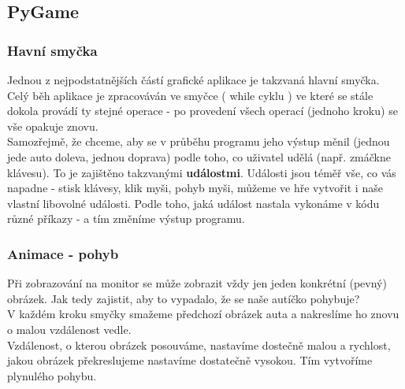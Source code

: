  





\subsection{PyGame}
\subsubsection{Havní smyčka}
Jednou z nejpodstatnějších částí grafické aplikace je takzvaná hlavní smyčka. Celý běh aplikace je zpracováván ve smyčce ( while cyklu ) ve které se stále dokola provádí ty stejné operace - po provedení všech operací (jednoho kroku) se vše opakuje znovu.\\
Samozřejmě, že chceme, aby se v průběhu programu jeho výstup měnil (jednou jede auto doleva, jednou doprava) podle toho, co uživatel udělá (např. zmáčkne klávesu). To je zajištěno takzvanými \textbf{událostmi}. Události jsou téměř vše, co vás napadne - stisk klávesy, klik myši, pohyb myši, můžeme ve hře vytvořit i naše vlastní libovolné události. Podle toho, jaká událost nastala vykonáme v kódu různé příkazy - a tím změníme výstup programu.\\

\subsubsection{Animace - pohyb}
Při zobrazování na monitor se může zobrazit vždy jen jeden konkrétní (pevný) obrázek. Jak tedy zajistit, aby to vypadalo, že se naše autíčko pohybuje?\\
V každém kroku smyčky smažeme předchozí obrázek auta a nakreslíme ho znovu o malou vzdálenost vedle.\\
Vzdálenost, o kterou obrázek posouváme, nastavíme dostečně malou a rychlost, jakou obrázek překreslujeme nastavíme dostatečně vysokou. Tím vytvoříme  plynulého pohybu.\\


